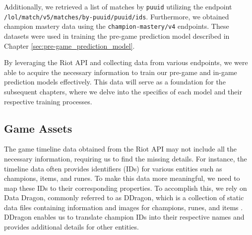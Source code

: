 \documentclass[11pt,a4paper,oneside]{report}
\begin{document}
Additionally, we retrieved a list of matches by \texttt{puuid} utilizing the endpoint \\ \texttt{/lol/match/v5/matches/by-puuid/{puuid}/ids}. Furthermore, we obtained champion mastery data using the \texttt{champion-mastery/v4} endpoints. These datasets were used in training the pre-game prediction model described in Chapter \ref{sec:pre-game_prediction_model}.

By leveraging the Riot API and collecting data from various endpoints, we were able to acquire the necessary information to train our pre-game and in-game prediction models effectively. This data will serve as a foundation for the subsequent chapters, where we delve into the specifics of each model and their respective training processes.






\subsection{Game Assets}

The game timeline data obtained from the Riot API may not include all the necessary information, requiring us to find the missing details. For instance, the timeline data often provides identifiers (IDs) for various entities such as champions, items, and runes. To make this data more meaningful, we need to map these IDs to their corresponding properties. To accomplish this, we rely on Data Dragon, commonly referred to as DDragon, which is a collection of static data files containing information and images for champions, runes, and items \cite{ddragon}. DDragon enables us to translate champion IDs into their respective names and provides additional details for other entities.
\end{document}
